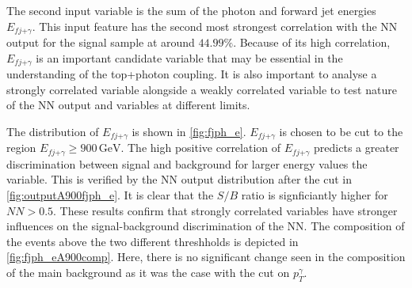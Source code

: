 The second input variable is the sum of the photon and forward jet energies $E_{fj\text{+}\gamma}$. This input feature has the second most strongest correlation with the NN output for the signal sample at around $44.99\%$. 
Because of its high correlation, $E_{fj\text{+}\gamma}$ is an important candidate variable that may be essential in the understanding of the top+photon coupling. It is also important to analyse a strongly correlated variable alongside a weakly correlated variable to test nature of the NN output and variables at different limits.

The distribution of $E_{fj\text{+}\gamma}$ is shown in \autoref{fig:fjph_e}. $E_{fj\text{+}\gamma}$ is chosen to be cut to the region $E_{fj\text{+}\gamma} \geq 900\,\si{\giga\electronvolt}$. 
The high positive correlation of $E_{fj\text{+}\gamma}$ predicts a greater discrimination between signal and background for larger energy values the variable. This is verified by the NN output distribution after the cut in 
\autoref{fig:outputA900fjph_e}. It is clear that the $S/B$ ratio is signficiantly higher for $NN > 0.5$. These results confirm that strongly correlated variables have stronger influences on the signal-background discrimination of the NN.
The composition of the events above the two different threshholds is depicted in \autoref{fig:fjph_eA900comp}. Here, there is no significant change seen in the composition of the main background as it was the case with the cut on $p_T^\gamma$. 


